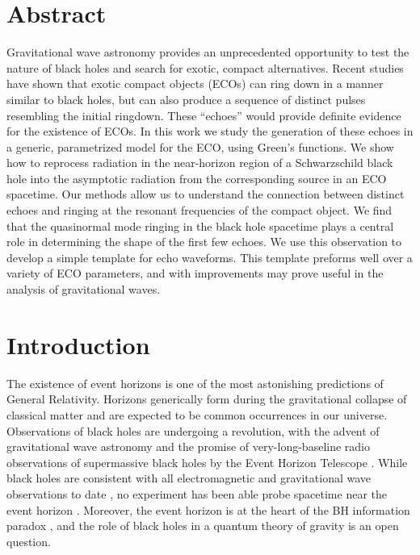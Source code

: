 \begin{refsection}
\section{Abstract}
Gravitational wave astronomy provides an unprecedented opportunity to test the nature of black holes and search for exotic, compact alternatives. 
Recent studies have shown that exotic compact objects (ECOs) can ring down in a manner similar to black holes, but can also produce a sequence of distinct pulses resembling the initial ringdown. 
These ``echoes'' would provide definite evidence for the existence of ECOs. 
In this work we study the generation of these echoes in a generic, parametrized model for the ECO, using Green's functions.
We show how to reprocess radiation in the near-horizon region of a Schwarzschild black hole into the asymptotic radiation from the corresponding source in an ECO spacetime.
Our methods allow us to understand the connection between distinct echoes and ringing at the resonant frequencies of the compact object.
We find that the quasinormal mode ringing in the black hole spacetime plays a central role in determining the shape of the first few echoes. 
We use this observation to develop a simple template for echo waveforms.
This template preforms well over a variety of ECO parameters, and with improvements may prove useful in the analysis of gravitational waves.

\section{Introduction}

The existence of event horizons is one of the most astonishing predictions of General Relativity.  
Horizons generically \cite{Thorne:1972ji} form during the gravitational collapse of classical matter and are expected to be common occurrences in our universe. 
Observations of black holes are undergoing a revolution, with the advent of gravitational wave astronomy \cite{Abbott:2016blz,Abbott:2016nmj,TheLIGOScientific:2016pea,LIGO:GW170104} and the promise of very-long-baseline radio observations of supermassive black holes by the Event Horizon Telescope \cite{Falcke:1999pj,Johnson:2015iwg}.
While black holes are consistent with all electromagnetic and gravitational wave observations to date \cite{TheLIGOScientific:2016src,Yagi:2016jml,Yunes:2016jcc,TheLIGOScientific:2016pea,LIGO:GW170104}, no experiment has been able probe spacetime near the event horizon \cite{Eckart:2017bhq,Abramowicz:2002vt,CardosoReview}.
Moreover, the event horizon is at  the heart of the BH information paradox \cite{Unruh:2017uaw}, and the role of black holes in a quantum theory of gravity is an open question. 


\end{refsection}

